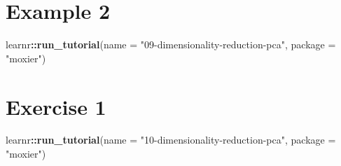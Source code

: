 \documentclass[]{book}
\newenvironment{Shaded}{\begin{snugshade}}{\end{snugshade}}
\newcommand{\KeywordTok}[1]{\textcolor[rgb]{0.13,0.29,0.53}{\textbf{#1}}}
\newcommand{\DataTypeTok}[1]{\textcolor[rgb]{0.13,0.29,0.53}{#1}}
\newcommand{\StringTok}[1]{\textcolor[rgb]{0.31,0.60,0.02}{#1}}
\newcommand{\OperatorTok}[1]{\textcolor[rgb]{0.81,0.36,0.00}{\textbf{#1}}}
\newcommand{\NormalTok}[1]{#1}
\begin{document}
\section{Example 2}\label{example-2}

\begin{Shaded}
\begin{Highlighting}[]
\NormalTok{learnr}\OperatorTok{::}\KeywordTok{run_tutorial}\NormalTok{(}\DataTypeTok{name =} \StringTok{"09-dimensionality-reduction-pca"}\NormalTok{,}
                     \DataTypeTok{package =} \StringTok{"moxier"}\NormalTok{)}
\end{Highlighting}
\end{Shaded}

\section{Exercise 1}\label{exercise-1}

\begin{Shaded}
\begin{Highlighting}[]
\NormalTok{learnr}\OperatorTok{::}\KeywordTok{run_tutorial}\NormalTok{(}\DataTypeTok{name =} \StringTok{"10-dimensionality-reduction-pca"}\NormalTok{,}
                     \DataTypeTok{package =} \StringTok{"moxier"}\NormalTok{)}
\end{Highlighting}
\end{Shaded}


\end{document}

